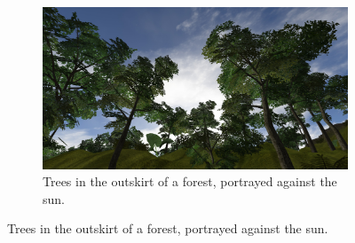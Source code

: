 \begin{figure}[H]
\begin{subfigure}{0.9\textwidth}
\end{subfigure}%
\\
\begin{subfigure}{0.9\textwidth}
  \centering
  \includegraphics[width=0.9\linewidth]{images/vegetation2.jpg}
  \caption{Trees in the outskirt of a forest, portrayed against the sun.}
  \label{fig:vegetation2}
\end{subfigure}
\label{fig:vegetationViwes}
\end{figure}

\newpage

